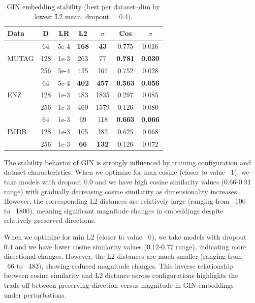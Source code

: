 \begin{table}
\centering
\footnotesize
\setlength{\tabcolsep}{3pt}
\begin{tabular}{l c c c c c c}
\hline
\textbf{Data} & \textbf{D} & \textbf{LR} &
\textbf{L2} & \textbf{$\sigma$} &
\textbf{Cos} & \textbf{$\sigma$} \\
\hline
 & 64  & 5e-4 & \textbf{168} & \textbf{43}  & 0.775 & 0.016 \\
MUTAG & 128 & 1e-3 & 263 & 77  & \textbf{0.781} & \textbf{0.030} \\
 & 256 & 5e-4 & 455 & 167 & 0.752 & 0.028 \\
\hline
   & 64  & 5e-4 & \textbf{402} & \textbf{457} & \textbf{0.563} & \textbf{0.056} \\
ENZ   & 128 & 1e-3 & 483 & 1835& 0.297 & 0.085 \\
  & 256 & 1e-3 & 460 & 1579& 0.126 & 0.080 \\
\hline
  & 64  & 1e-3 & 69  & 118 & \textbf{0.663} & \textbf{0.066} \\
IMDB  & 128 & 1e-3 & 105 & 182 & 0.625 & 0.068 \\
  & 256 & 1e-3 & \textbf{66}  & \textbf{132} & 0.126 & 0.072 \\
\hline
\end{tabular}
\caption{GIN embedding stability (best per dataset--dim by lowest L2 mean, dropout = 0.4).}
\label{tab:stability_gin_best_l2}
\end{table}


The stability behavior of GIN is strongly influenced by training configuration and dataset characteristics.
When we optimize for max  cosine (closer to value ~1),
we take models with dropout 0.0 and we have high cosine similarity values (0.66-0.91 range) 
with gradually decreasing cosine similarity as dimensionality increases.
However, the corresponding L2 distances are relatively large (ranging from ~100 to ~1800),
meaning significant magnitude changes in embeddings despite relatively preserved directions.

When we optimize for min L2 (closer to value ~0),
we take models with dropout 0.4 and we have lower cosine similarity values (0.12-0.77 range),
indicating more directional changes.
However, the L2 distances are much smaller (ranging from ~66 to ~483), showing reduced magnitude changes.
This inverse relationship between cosine similarity and L2 distance across configurations
highlights the trade off between preserving direction versus magnitude in GIN embeddings under perturbations.




